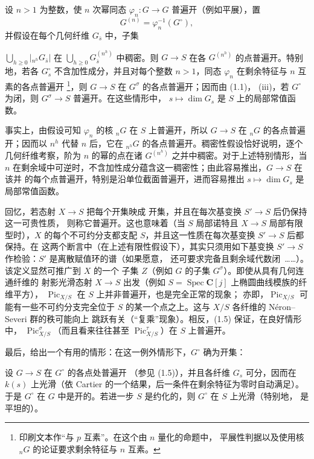  设 $n>1$ 为整数，使 $n$ 次幂同态
$\varphi_n:G\longrightarrow G$ 普遍开（例如平展），置
\[
G^{(n)}=\varphi_n^{-1}(G^\circ),
\]
并假设在每个几何纤维 $G_{\bar s}$ 中，子集

$\bigcup_{h\geq0}|{}_{n^h}G_{\bar s}|$ 在
$\bigcup_{h\geq0}G_{\bar s}^{(n^h)}$ 中稠密。则 $G\longrightarrow S$ 在各 $G^{(n^h)}$ 的点普遍开。特别
地，若各 $G_s^\circ$ 不含加性成分，并且对每个整数 $n>1$，同态
$\varphi_n$ 在剩余特征与 $n$ 互素的各点普遍开
\footnote{印刷文本作“与 $p$ 互素”。在这个由 $n$ 量化的命题中，
平展性判据以及使用核 ${}_nG$ 的论证要求剩余特征与 $n$ 互素。}，则
$G\longrightarrow S$ 在 $G^\sigma$ 的各点普遍开；因而由 (1.1)，
(iii)，若 $G^\circ$ 为闭，则
$G^\sigma\longrightarrow S$ 普遍开。在这些情形中，
$s\longmapsto\dim G_s$ 是 $S$ 上的局部常值函数。

事实上，由假设可知 $\varphi_n$ 的核 ${}_nG$ 在 $S$ 上普遍开，所以
$G\longrightarrow S$ 在 ${}_nG$ 的各点普遍开；因而以 $n^h$ 代替
$n$ 后，它在 ${}_{n^h}G$ 的各点普遍开。稠密性假设恰好说明，逐个几何纤维考察，阶为 $n$ 的幂的点在诸 $G^{(n^h)}$ 之并中稠密。对于上述特别情形，当 $n$ 在剩余域中可逆时，不含加性成分蕴含这一稠密性；由此容易推出，$G\longrightarrow S$ 在该并
的每个点普遍开，特别是沿单位截面普遍开，进而容易推出
$s\longmapsto\dim G_s$ 是局部常值函数。

 回忆，若态射 $X\longrightarrow S$ 把每个开集映成
开集，并且在每次基变换 $S'\longrightarrow S$ 后仍保持这一可贵性质，
则称它普遍开。这也意味着（当 $S$ 局部诺特且
$X\longrightarrow S$ 局部有限型时），$X$ 的每个不可约分支都支配
$S$，并且这一性质在每次基变换 $S'\longrightarrow S$ 后都保持。在
这两个断言中（在上述有限性假设下），其实只须用如下基变换
$S'\longrightarrow S$ 作检验：$S'$ 是离散赋值环的谱（如果愿意，
还可要求完备且剩余域代数闭~……）。该定义显然可推广到 $X$ 的一个
子集 $Z$（例如 $G$ 的子集 $G^\sigma$）。即使从具有几何连通纤维的
射影光滑态射 $X\longrightarrow S$ 出发（例如
$S=\operatorname{Spec}\mathbf C[j]$ 上椭圆曲线模族的纤维平方），
$\operatorname{Pic}_{X/S}$ 在 $S$ 上并非普遍开，也是完全正常的现象；
亦即，$\operatorname{Pic}_{X/S}$ 可能有一些不可约分支完全位于 $S$
的某一个点之上。这与 $X/S$ 各纤维的 Néron--Severi 群的秩可能向上
跳跃有关（“复乘”现象）。相反，(1.5) 保证，在良好情形中，
$\operatorname{Pic}_{X/S}^\sigma$（而且看来往往甚至
$\operatorname{Pic}_{X/S}^\tau$）在 $S$ 上普遍开。


最后，给出一个有用的情形：在这一例外情形下，$G^\circ$ 确为开集：

 设 $G\longrightarrow S$ 在 $G^\circ$ 的各点处普遍开
（参见 (1.5)），并且各纤维 $G_s$ 可分，因而在 $k(s)$ 上光滑（依 Cartier
的一个结果，后一条件在剩余特征为零时自动满足）。于是 $G^\circ$ 在 $G$
中是开的。若进一步 $S$ 是约化的，则 $G^\circ$ 在 $S$ 上光滑（特别地，
是平坦的）。


